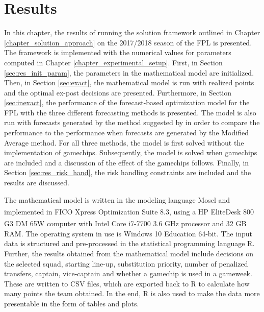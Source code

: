 
\chapter{Results} \label{chapter_computational_study}

In this chapter, the results of running the solution framework outlined in Chapter \ref{chapter_solution_approach} on the 2017/2018 season of the FPL is presented. The framework is implemented with the numerical values for parameters computed in Chapter \ref{chapter_experimental_setup}. First, in Section \ref{sec:res_init_param}, the parameters in the mathematical model are initialized. Then, in Section \ref{sec:exact}, the mathematical model is run with realized points and the optimal ex-post decisions are presented. Furthermore, in Section \ref{sec:inexact}, the performance of the forecast-based optimization model for the FPL with the three different forecasting methods is presented. The model is also run with forecasts generated by the method suggested by \cite{Bonomo} in order to compare the performance to the performance when forecasts are generated by the Modified Average method. For all three methods, the model is first solved without the implementation of gamechips. Subsequently, the model is solved when gamechips are included and a discussion of the effect of the gamechips follows. Finally, in Section \ref{sec:res_risk_hand}, the risk handling constraints are included and the results are discussed.

\newpar

The mathematical model is written in the modeling language Mosel and implemented in FICO\textsuperscript {\textregistered} Xpress Optimization Suite 8.3, using a HP EliteDesk 800 G3 DM 65W computer with Intel\textsuperscript{\textregistered} Core\textsuperscript{\texttrademark} i7-7700 3.6 GHz processor and 32 GB RAM. The operating system in use is Windows 10 Education 64-bit. The input data is structured and pre-processed in the statistical programming language R. Further, the results obtained from the mathematical model include decisions on the selected squad, starting line-up, substitution priority, number of penalized transfers, captain, vice-captain and whether a gamechip is used in a gameweek. These are written to CSV files, which are exported back to R to calculate how many points the team obtained. In the end, R is also used to make the data more presentable in the form of tables and plots.

